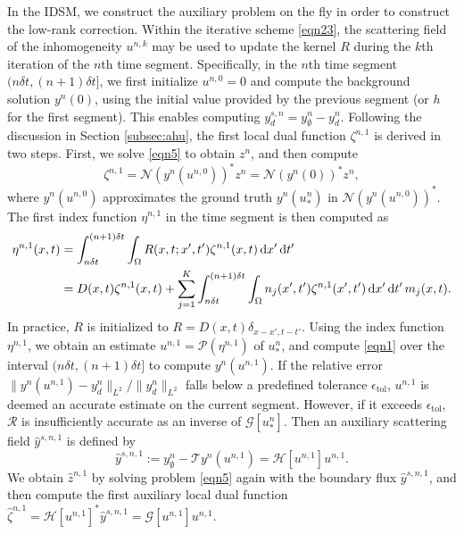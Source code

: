 \documentclass[onefignum,onetabnum]{siamart190516}
\numberwithin{equation}{section}
\begin{document}
In the IDSM, we construct the auxiliary problem on the fly in order to construct the low-rank correction.
Within the iterative scheme \eqref{eqn23}, the scattering field of the inhomogeneity $u^{n,k}$ may be used to update the kernel $R$ during the $k$th iteration of the $n$th time segment.
Specifically, in the $n$th time segment $(n\delta t, (n+1)\delta t]$, we first initialize $u^{n,0}=0$ and compute the background solution $y^{n}(0)$, using the initial value provided by the previous segment (or $h$ for the first segment).
This enables computing $y^{s,n}_{d} = y_{\emptyset}^{n} - y_{d}^{n}$.
Following the discussion in Section \ref{subsec:ahu}, the first local dual function $\zeta^{n,1}$ is derived in two steps.
First, we solve \eqref{eqn5} to obtain $z^{n}$, and then compute
\begin{equation}\label{eqn18}
\zeta^{n,1} = \mathcal{N}(y^{n}(u^{n,0}))^{*} z^{n}= \mathcal{N}(y^{n}(0))^{*} z^{n},
\end{equation}
where $y^{n}(u^{n,0})$ approximates the ground truth $y^{n}(u_{*}^{n})$ in $\mathcal{N}(y^{n}(u^{n,0}))^{*}$.
The first index function $\eta^{n,1}$ in the time segment is then computed as
\begin{align}
\eta^{n,1}(x, t) &= \int_{n\delta t}^{(n+1)\delta t} \int_{\Omega} R(x, t; x', t') \zeta^{n,1}(x, t) \, \mathrm{d}x' \, \mathrm{d}t' \notag \\
&= D(x, t) \zeta^{n,1}(x, t) + \sum_{j=1}^{K} \int_{n\delta t}^{(n+1)\delta t} \int_{\Omega} n_{j}(x', t') \zeta^{n,1}(x', t') \, \mathrm{d}x' \, \mathrm{d}t' \, m_{j}(x, t). \label{eqn21}
\end{align}
In practice, $R$ is initialized to $R = D(x, t) \delta_{x - x', t - t'}$.
Using the index function $\eta^{n,1}$, we obtain an estimate $u^{n,1}=\mathcal{P}(\eta^{n,1})$ of $u_{*}^{n}$, and compute \eqref{eqn1} over the interval $(n\delta t, (n+1)\delta t]$ to compute $y^{n}(u^{n,1})$.
If the relative error $\|y^{n}(u^{n,1}) - y_{d}^{n}\|_{L^{2}}/\|y_{d}^{n}\|_{L^{2}}$ falls below a predefined tolerance $\epsilon_{\text{tol}}$, $u^{n,1}$ is deemed an accurate estimate on the current segment.
However, if it exceeds $\epsilon_{\text{tol}}$, $\mathcal{R}$ is insufficiently accurate as an inverse of $\mathcal{G}[u_{*}^{n}]$.
Then an auxiliary scattering field $\hat{y}^{s,n,1}$ is defined by $$\hat{y}^{s,n,1} := y_{\emptyset}^{n} - \mathcal{T} y^{n}(u^{n,1}) = \mathcal{H}[u^{n,1}] u^{n,1}.$$
We obtain $\hat{z}^{n,1}$ by solving problem \eqref{eqn5} again with the boundary flux $\hat{y}^{s,n,1}$, and then compute the first auxiliary local dual function $\hat{\zeta}^{n,1} = \mathcal{H}[u^{n,1}]^{*} \hat{y}^{s,n,1} = \mathcal{G}[u^{n,1}] u^{n,1}$.
\end{document}
